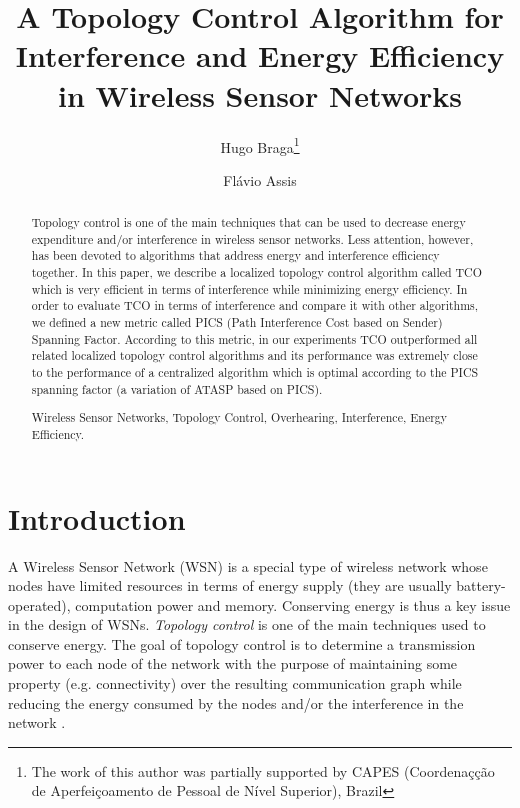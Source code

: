 \documentclass{llncs}
\newcommand{\keywords}[1]{\par\addvspace\baselineskip
\noindent\keywordname\enspace\ignorespaces#1}
\begin{document}
\title{A Topology Control Algorithm for Interference and Energy Efficiency in Wireless Sensor Networks}

\author{Hugo Braga\thanks{The work of this author was partially supported by CAPES (Coordenaç\c{c}\~ao de Aperfei\c{c}oamento
de Pessoal de N\'ivel Superior), Brazil} \and Fl\'avio Assis}

\maketitle

\newtheorem{mydef}{Definition}

\begin{abstract}
Topology control is one of the main techniques that can be used to decrease energy expenditure and/or interference in wireless sensor networks. 
Less attention, however, has been devoted to algorithms that address energy and interference efficiency together. 
In this paper, we describe a localized topology control algorithm called TCO which is very efficient in terms of interference while minimizing energy efficiency. 
In order to evaluate TCO in terms of interference and compare it with other algorithms,
we defined a new metric called PICS (Path Interference Cost based on Sender) Spanning Factor. According to this metric, in our experiments TCO outperformed all related localized topology control 
algorithms and its performance was extremely close to the performance of a centralized algorithm which is optimal according to the PICS spanning factor
(a variation of ATASP based on PICS).
\keywords{Wireless Sensor Networks, Topology Control, Overhearing, Interference, Energy Efficiency.}
\end{abstract}

\section{Introduction}

A Wireless Sensor Network (WSN) is a special type of wireless network whose nodes have limited resources in terms of energy supply (they are usually battery-operated), 
computation power and memory. Conserving energy is thus a key issue in the design of WSNs.
\textit{Topology control} is one of the main techniques used to conserve energy. The goal of topology control is to determine a transmission power 
to each node of the network with the purpose of maintaining some property (e.g. connectivity) over the resulting communication graph while reducing the energy consumed by the nodes and/or
the interference in the network \cite{Santi05a}. 
\end{document}

